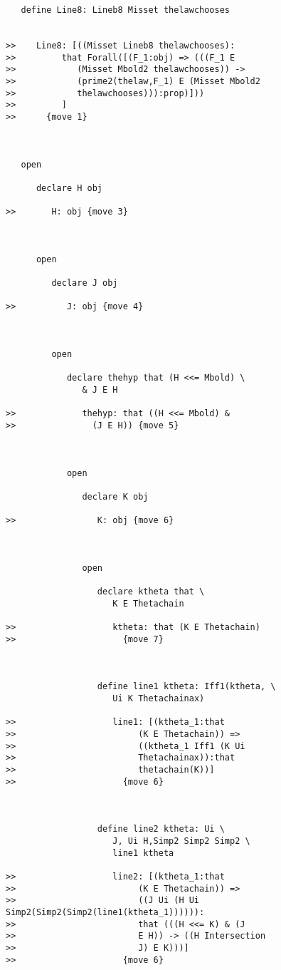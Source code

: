 \documentclass[12pt]{article}
\begin{document}
\begin{verbatim}
   define Line8: Lineb8 Misset thelawchooses


>>    Line8: [((Misset Lineb8 thelawchooses):
>>         that Forall([(F_1:obj) => (((F_1 E
>>            (Misset Mbold2 thelawchooses)) ->
>>            (prime2(thelaw,F_1) E (Misset Mbold2
>>            thelawchooses))):prop)]))
>>         ]
>>      {move 1}



   open

      declare H obj

>>       H: obj {move 3}



      open

         declare J obj

>>          J: obj {move 4}



         open

            declare thehyp that (H <<= Mbold) \
               & J E H

>>             thehyp: that ((H <<= Mbold) &
>>               (J E H)) {move 5}



            open

               declare K obj

>>                K: obj {move 6}



               open

                  declare ktheta that \
                     K E Thetachain

>>                   ktheta: that (K E Thetachain)
>>                     {move 7}



                  define line1 ktheta: Iff1(ktheta, \
                     Ui K Thetachainax)

>>                   line1: [(ktheta_1:that
>>                        (K E Thetachain)) =>
>>                        ((ktheta_1 Iff1 (K Ui
>>                        Thetachainax)):that
>>                        thetachain(K))]
>>                     {move 6}



                  define line2 ktheta: Ui \
                     J, Ui H,Simp2 Simp2 Simp2 \
                     line1 ktheta

>>                   line2: [(ktheta_1:that
>>                        (K E Thetachain)) =>
>>                        ((J Ui (H Ui Simp2(Simp2(Simp2(line1(ktheta_1)))))):
>>                        that (((H <<= K) & (J
>>                        E H)) -> ((H Intersection
>>                        J) E K)))]
>>                     {move 6}




\end{verbatim}
\end{document}
